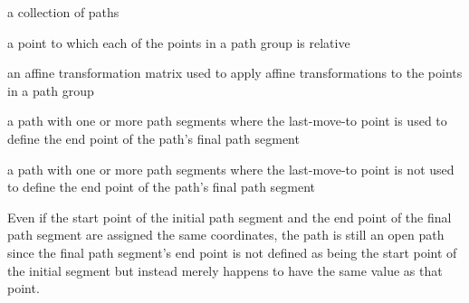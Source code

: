 %
a collection of paths

%
a point to which each of the points in a path group is relative

%
an affine transformation matrix used to apply affine transformations to the points in a path group

%
a path with one or more path segments where the last-move-to point is used to define the end point of the path's final path segment

%
a path with one or more path segments where the last-move-to point is not used to define the end point of the path's final path segment
\begin{note}
Even if the start point of the initial path segment and the end point of the final path segment are assigned the same coordinates, the path is still an open path since the final path segment's end point is not defined as being the start point of the initial segment but instead merely happens to have the same value as that point.
\end{note}
%
%
